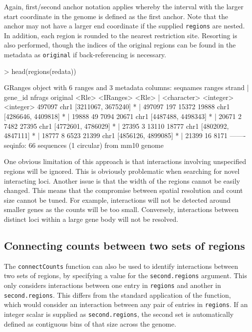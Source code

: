 \documentclass[12pt]{report}
\renewenvironment{Schunk}{\vspace{0pt}}{\vspace{0pt}}
\newcommand{\code}[1]{{\small\texttt{#1}}}
\begin{document}
Again, first/second anchor notation applies whereby the interval with the larger start coordinate in the genome is defined as the first anchor.
Note that the anchor may not have a larger end coordinate if the supplied \code{regions} are nested.
In addition, each region is rounded to the nearest restriction site.
Resorting is also performed, though the indices of the original regions can be found in the metadata as \code{original} if back-referencing is necessary.

\begin{Schunk}
\begin{Sinput}
> head(regions(redata))
\end{Sinput}
\begin{Soutput}
GRanges object with 6 ranges and 3 metadata columns:
         seqnames             ranges strand |     gene_id    nfrags  original
            <Rle>          <IRanges>  <Rle> | <character> <integer> <integer>
  497097     chr1 [3211067, 3675240]      * |      497097       197     15372
   19888     chr1 [4286646, 4409818]      * |       19888        49      7094
   20671     chr1 [4487488, 4498343]      * |       20671         2      7482
   27395     chr1 [4772601, 4786029]      * |       27395         3     13110
   18777     chr1 [4802092, 4847111]      * |       18777         8      6523
   21399     chr1 [4856126, 4899085]      * |       21399        16      8171
  -------
  seqinfo: 66 sequences (1 circular) from mm10 genome
\end{Soutput}
\end{Schunk}

One obvious limitation of this approach is that interactions involving unspecified regions will be ignored.
This is obviously problematic when searching for novel interacting loci.
Another issue is that the width of the regions cannot be easily changed.
This means that the compromise between spatial resolution and count size cannot be tuned.
For example, interactions will not be detected around smaller genes as the counts will be too small.
Conversely, interactions between distinct loci within a large gene body will not be resolved.

\subsection{Connecting counts between two sets of regions}
The \code{connectCounts} function can also be used to identify interactions between two sets of regions, by specifying a value for the \code{second.regions} argument.
This only considers interactions between one entry in \code{regions} and another in \code{second.regions}.
This differs from the standard application of the function, which would consider an interaction between any pair of entries in \code{regions}.
If an integer scalar is supplied as \code{second.regions}, the second set is automatically defined as contiguous bins of that size across the genome.
\end{document}
